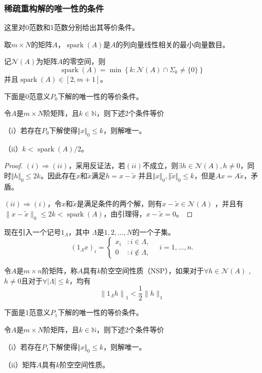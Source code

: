 \subsubsection{稀疏重构解的唯一性的条件}
这里对0范数和1范数分别给出其等价条件。
\begin{definition}
    取$m\times N$的矩阵$A$，$ \operatorname{spark}(A)$是$A$的列向量线性相关的最小向量数目。
\end{definition}
\begin{lemma}
    记$\mathcal{N}(A)$为矩阵$A$的零空间，则
   \begin{equation}
    \operatorname{spark}(A)=\min \left\{k: \mathcal{N}(A) \cap \Sigma_k \neq\{0\}\right\}
   \end{equation}
   并且$\operatorname{spark}(A) \in[2, m+1]$。
\end{lemma}
下面是0范意义$P_0$下解的唯一性的等价条件。
\begin{theorem}
    令$A$是$m\times N$阶矩阵，且$k \in \mathbb{N}$，则下述2个条件等价\par
    （i）若存在$P_0$下解使得$\Vert x \Vert_0 \le k$，则解唯一。\par
    （ii）$k<\operatorname{spark}(A)/2 $。
\end{theorem}
\begin{proof}
    $(i)\Rightarrow (ii)$，采用反证法，若$(ii)$不成立，则$\exists h \in \mathcal{N}(A)
    ,h\neq 0$，同时$\Vert h \Vert_0 \le 2k$。因此存在$x$和$\tilde{x}$满足$h=x-\tilde{x}$
    并且$\Vert x \Vert_0 ,\Vert \tilde{x} \Vert_0 \le k$，但是$Ax=A\tilde{x}$，矛盾。\par
    $(ii)\Rightarrow (i)$，令$x$和$\tilde{x}$是满足条件的两个解，则有$x-\tilde{x}\in \mathcal{N}(A)$
    ，并且有$\|x-\tilde{x}\|_0 \leq 2 k<\operatorname{spark}(A)$，由引理得，$x-\tilde{x}=0$。
\end{proof}
现在引入一个记号$1_{\Lambda}$，其中 $\Lambda$是${1,2,\ldots,N}$的一个子集。
\begin{equation}
    \left(1_{\Lambda} x\right)_i=\left\{ \begin{array}{rl}
    x_i & : i \in \Lambda, \\
    0 & : i \notin \Lambda,
    \end{array} \quad i=1, \ldots, n .\right .
\end{equation}
\begin{definition}
    令$A$是$m\times n$阶矩阵，称$A$具有$k$阶空空间性质（NSP），如果对于$\forall h \in \mathcal{N}(A)$
    ,$h \neq 0$且对于$\forall |\Lambda| \leq k$，均有
    \begin{equation}
        \left\|1_{\Lambda} h\right\|_1<\frac{1}{2}\|h\|_1
    \end{equation}
\end{definition}
下面是1范意义$P_1$下解的唯一性的等价条件。
\begin{theorem}
    令$A$是$m\times N$阶矩阵，且$k \in \mathbb{N}$，则下述2个条件等价\par
    （i）若存在$P_1$下解使得$\Vert x \Vert_0 \le k$，则解唯一。\par
    （ii）矩阵$A$具有$k$阶空空间性质。
\end{theorem}

